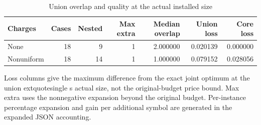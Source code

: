 \begin{table}[p]\centering\small
\caption{Union overlap and quality at the actual installed size}\label{tab:r45-union}
\begin{tabular}{lrrrrrr}\toprule
Charges & Cases & Nested & Max extra & Median overlap & Union loss & Core loss \\
\midrule
None & 18 & 9 & 1 & 2.000000 & 0.020139 & 0.000000 \\
Nonuniform & 18 & 14 & 1 & 1.000000 & 0.079152 & 0.028056 \\
\bottomrule\end{tabular}
\par\smallskip\begin{minipage}{.98\textwidth}\footnotesize Loss columns give the maximum difference from the exact joint optimum at the union	extquotesingle s actual size, not the original-budget price bound. Max extra uses the nonnegative expansion beyond the original budget. Per-instance percentage expansion and gain per additional symbol are generated in the expanded JSON accounting.\end{minipage}
\end{table}
